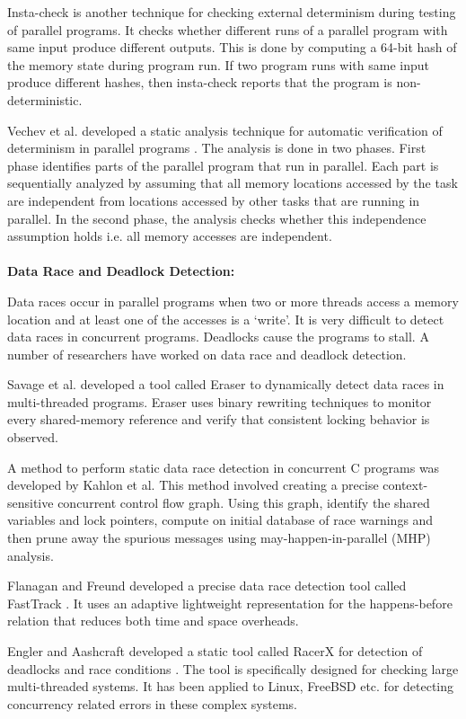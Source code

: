 Insta-check \cite{nistor2010instantcheck} is another technique for checking external determinism during testing of parallel programs. It checks whether different runs of a parallel program with same input produce different outputs. This is done by computing a 64-bit hash of the memory state during program run. If two program runs with same input produce different hashes, then insta-check reports that the program is non-deterministic. 

Vechev et al. developed a static analysis technique for automatic verification of determinism in parallel programs \cite{vechev2011automatic}. The analysis is done in two phases. First phase identifies parts of the parallel program that run in parallel. Each part is sequentially analyzed by assuming that all memory locations accessed by the task are independent from locations accessed by other tasks that are running in parallel. In the second phase, the analysis checks whether this independence assumption holds i.e. all memory accesses are independent.
\\
\\
\textbf{Data Race and Deadlock Detection: }

Data races occur in parallel programs when two or more threads access a memory location and at least one of the accesses is a ‘write’.  It is very difficult to detect data races in concurrent programs. Deadlocks cause the programs to stall. A number of researchers have worked on data race and deadlock detection.

Savage et al. developed a tool called Eraser \cite{savage1997eraser} to dynamically detect data races in multi-threaded programs. Eraser uses binary rewriting techniques to monitor every shared-memory reference and verify that consistent locking behavior is observed.

A method to perform static data race detection in concurrent C programs was developed by Kahlon et al. This method \cite{kahlon2009static} involved creating a precise context-sensitive concurrent control flow graph. Using this graph, identify the shared variables and lock pointers, compute on initial database of race warnings and then prune away the spurious messages using may-happen-in-parallel (MHP) analysis.

Flanagan and Freund developed a precise data race detection tool called FastTrack \cite{flanagan2009fasttrack}. It uses an adaptive lightweight representation for the happens-before relation that reduces both time and space overheads.

Engler and Aashcraft developed a static tool called RacerX for detection of deadlocks and race conditions \cite{engler2003racerx}. The tool is specifically designed for checking large multi-threaded systems. It has been applied to Linux, FreeBSD etc. for detecting concurrency related errors in these complex systems. 